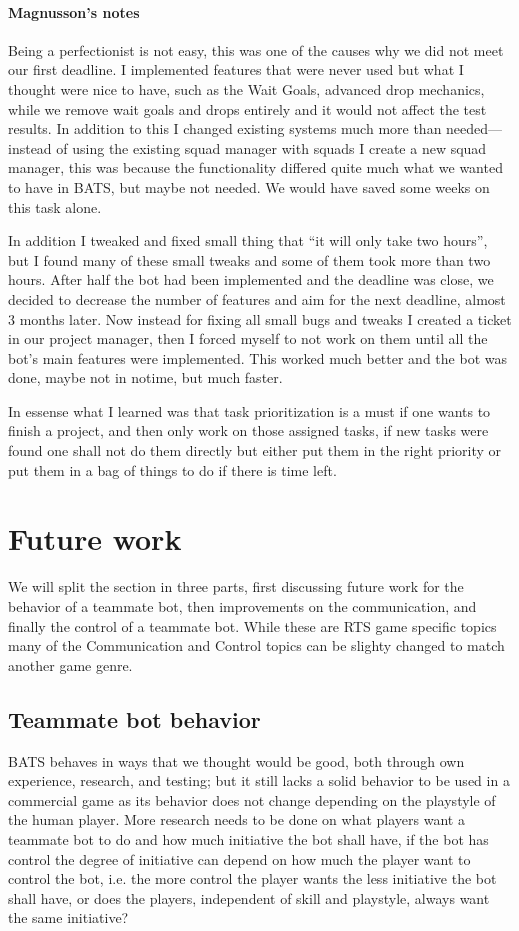 \paragraph{Magnusson's notes}
Being a perfectionist is not easy, this was one of the causes why we did not meet our first deadline. I implemented features that were never used but what I thought were nice to have, such as the Wait Goals, advanced drop mechanics, while we remove wait goals and drops entirely and it would not affect the test results. In addition to this I changed existing systems much more than needed—instead of using the existing squad manager with squads I create a new squad manager, this was because the functionality differed quite much what we wanted to have in BATS, but maybe not needed. We would have saved some weeks on this task alone.

In addition I tweaked and fixed small thing that ``it will only take two hours'', but I found many of these small tweaks and some of them took more than two hours. After half the bot had been implemented and the deadline was close, we decided to decrease the number of features and aim for the next deadline, almost 3 months later. Now instead for fixing all small bugs and tweaks I created a ticket in our project manager, then I forced myself to not work on them until all the bot's main features were implemented. This worked much better and the bot was done, maybe not in notime, but much faster.

In essense what I learned was that task prioritization is a must if one wants to finish a project, and then only work on those assigned tasks, if new tasks were found one shall not do them directly but either put them in the right priority or put them in a bag of things to do if there is time left.

\section{Future work}
We will split the section in three parts, first discussing future work for the behavior of a teammate bot, then improvements on the communication, and finally the control of a teammate bot. While these are RTS game specific topics many of the Communication and Control topics can be slighty changed to match another game genre.

\subsection{Teammate bot behavior}
BATS behaves in ways that we thought would be good, both through own experience, research, and testing; but it still lacks a solid behavior to be used in a commercial game as its behavior does not change depending on the playstyle of the human player. More research needs to be done on what players want a teammate bot to do and how much initiative the bot shall have, if the bot has control the degree of initiative can depend on how much the player want to control the bot, i.e. the more control the player wants the less initiative the bot shall have, or does the players, independent of skill and playstyle, always want the same initiative?


